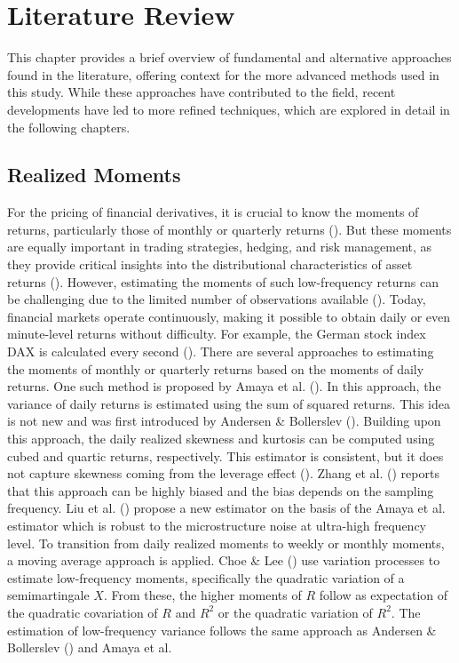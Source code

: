 \chapter{Literature Review}
\label{sec:literature}

This chapter provides a brief overview of fundamental and alternative approaches found in the literature, offering context for the more advanced methods used in this study. While these approaches have contributed to the field, recent developments have led to more refined techniques, which are explored in detail in the following chapters.

\section{Realized Moments}
For the pricing of financial derivatives, it is crucial to know the moments of returns, particularly those of monthly or quarterly returns (\cite{barroRareDisastersAsset2006}). But these moments are equally important in trading strategies, hedging, and risk management, as they provide critical insights into the distributional characteristics of asset returns (\cite{brooksOptimalHedgingHigher2012,jorionRiskManagementLessons1999,sheuEffectiveOptionsTrading2011}). However, estimating the moments of such low-frequency returns can be challenging due to the limited number of observations available (\cite{neubergerSkewnessStockMarket2021}). Today, financial markets operate continuously, making it possible to obtain daily or even minute-level returns without difficulty. For example, the German stock index DAX is calculated every second (\cite{boersefrankfurtFunktioniertBoerse}). There are several approaches to estimating the moments of monthly or quarterly returns based on the moments of daily returns. One such method is proposed by Amaya et al. (\citeyear{amayaDoesRealizedSkewness2015}). In this approach, the variance of daily returns is estimated using the sum of squared returns. This idea is not new and was first introduced by Andersen \& Bollerslev (\citeyear{andersenAnsweringSkepticsYes1998}). Building upon this approach, the daily realized skewness and kurtosis can be computed using cubed and quartic returns, respectively. This estimator is consistent, but it does not capture skewness coming from the leverage effect (\cite{galloDynamicTailRisk2024}). Zhang et al. (\citeyear{zhangTaleTwoTime2005}) reports that this approach can be highly biased and the bias depends on the sampling frequency. Liu et al. (\citeyear{liuRealizedSkewnessHigh2014}) propose a new estimator on the basis of the Amaya et al. estimator which is robust to the microstructure noise at ultra-high frequency level. To transition from daily realized moments to weekly or monthly moments, a moving average approach is applied. Choe \& Lee (\citeyear{choeHighMomentVariations2014}) use variation processes to estimate low-frequency moments, specifically the quadratic variation of a semimartingale $X$. From these, the higher moments of $R$ follow as expectation of the quadratic covariation of $R$ and $R^2$ or the quadratic variation of $R^2$. The estimation of low-frequency variance follows the same approach as Andersen \& Bollerslev (\citeyear{andersenAnsweringSkepticsYes1998}) and Amaya et al. 